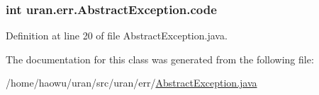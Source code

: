\subsubsection[{code}]{\setlength{\rightskip}{0pt plus 5cm}int uran.\+err.\+Abstract\+Exception.\+code\hspace{0.3cm}{\ttfamily [protected]}}\label{classuran_1_1err_1_1_abstract_exception_ae7426fa980ba2adb26260f26f8013ee3}


Definition at line 20 of file Abstract\+Exception.\+java.



The documentation for this class was generated from the following file\+:\begin{DoxyCompactItemize}
\item 
/home/haowu/uran/src/uran/err/\hyperlink{_abstract_exception_8java}{Abstract\+Exception.\+java}\end{DoxyCompactItemize}
